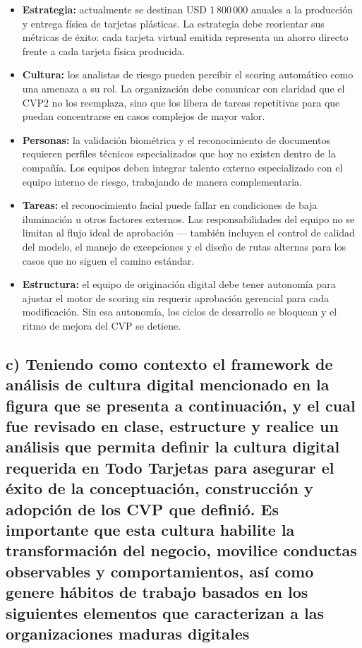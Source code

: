 \documentclass[12pt,letterpaper]{article}
\begin{document}
\begin{itemize}
  \item \textbf{Estrategia:} actualmente se destinan USD 1\,800\,000 anuales a la producción y
    entrega física de tarjetas plásticas. La estrategia debe reorientar sus métricas de éxito:
    cada tarjeta virtual emitida representa un ahorro directo frente a cada tarjeta física
    producida.
  \item \textbf{Cultura:} los analistas de riesgo pueden percibir el scoring automático como
    una amenaza a su rol. La organización debe comunicar con claridad que el CVP2 no los
    reemplaza, sino que los libera de tareas repetitivas para que puedan concentrarse en casos
    complejos de mayor valor.
  \item \textbf{Personas:} la validación biométrica y el reconocimiento de documentos requieren
    perfiles técnicos especializados que hoy no existen dentro de la compañía. Los equipos
    deben integrar talento externo especializado con el equipo interno de riesgo, trabajando de
    manera complementaria.
  \item \textbf{Tareas:} el reconocimiento facial puede fallar en condiciones de baja
    iluminación u otros factores externos. Las responsabilidades del equipo no se limitan al
    flujo ideal de aprobación — también incluyen el control de calidad del modelo, el manejo
    de excepciones y el diseño de rutas alternas para los casos que no siguen el camino
    estándar.
  \item \textbf{Estructura:} el equipo de originación digital debe tener autonomía para ajustar
    el motor de scoring sin requerir aprobación gerencial para cada modificación. Sin esa
    autonomía, los ciclos de desarrollo se bloquean y el ritmo de mejora del CVP se detiene.
\end{itemize}

\subsection*{c) Teniendo como contexto el framework de análisis de cultura digital mencionado en la figura que se presenta a continuación, y el cual fue 
revisado en clase, estructure y realice un análisis que permita definir la cultura digital requerida en Todo Tarjetas para asegurar el éxito de la 
conceptuación, construcción y adopción de los CVP que definió.     
Es importante que esta cultura habilite la transformación del negocio, movilice 
conductas observables y comportamientos, así como genere hábitos de trabajo basados en los siguientes elementos que caracterizan a las 
organizaciones maduras digitales}
\end{document}
